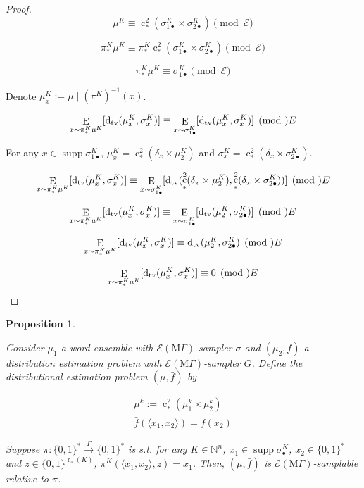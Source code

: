 \documentclass{article}
\numberwithin{equation}{section}
\theoremstyle{definition}
\theoremstyle{plain}
\newtheorem{proposition}{Proposition}[section]
\newcommand{\Bool}{\{0,1\}}
\newcommand{\Words}{{\Bool^*}}
\DeclareMathOperator{\Supp}{supp}
\DeclareMathOperator{\E}{E}
\DeclareMathOperator{\R}{r}
\DeclareMathOperator{\En}{c}
\newcommand{\Dtv}{\operatorname{d}_{\textnormal{tv}}}
\newcommand{\Nats}{\mathbb{N}}
\newcommand{\Chev}[1]{\langle #1 \rangle}
\newcommand{\MGrow}{\mathrm{M}\Gamma}
\newcommand{\Fall}{\mathcal{E}}
\newcommand{\EMG}{\Fall(\MGrow)}
\newcommand{\Scheme}{\xrightarrow{\Gamma}}
\begin{document}
\begin{proof}

\[\mu^{K} \equiv \En_*^2(\sigma_{1\bullet}^K \times \sigma_{2\bullet}^K)\pmod \Fall\]

\[\pi_*^K\mu^{K} \equiv \pi_*^K\En_*^2(\sigma_{1\bullet}^K \times \sigma_{2\bullet}^K) \pmod \Fall\] 

\[\pi_*^K\mu^{K} \equiv  \sigma_{1\bullet}^K \pmod \Fall\]

Denote $\mu_x^K:=\mu \mid (\pi^K)^{-1}(x)$.

\[\E_{x \sim \pi_*^K\mu^{K}}[\Dtv(\mu_x^K,\sigma_x^K)] \equiv \E_{x \sim \sigma_{1\bullet}^K}[\Dtv(\mu_x^K,\sigma_x^K)] \pmod \Fall\]

For any $x \in \Supp \sigma_{1\bullet}^{K}$, $\mu_x^K = \En_*^2(\delta_x \times \mu_2^{K})$ and $\sigma_x^K=\En_*^2(\delta_x \times \sigma_{2\bullet}^K)$.

\[\E_{x \sim \pi_*^K\mu^{K}}[\Dtv(\mu_x^K,\sigma_x^K)] \equiv \E_{x \sim \sigma_{1\bullet}^K}[\Dtv(\En_*^2(\delta_x \times \mu_2^{K}),\En_*^2(\delta_x \times \sigma_{2\bullet}^K))] \pmod \Fall\]

\[\E_{x \sim \pi_*^K\mu^{K}}[\Dtv(\mu_x^K,\sigma_x^K)] \equiv \E_{x \sim \sigma_{1\bullet}^K}[\Dtv(\mu_2^{K},\sigma_{2\bullet}^K)] \pmod \Fall\]

\[\E_{x \sim \pi_*^K\mu^{K}}[\Dtv(\mu_x^K,\sigma_x^K)] \equiv \Dtv(\mu_2^{K},\sigma_{2\bullet}^K) \pmod \Fall\]

\[\E_{x \sim \pi_*^K\mu^{K}}[\Dtv(\mu_x^K,\sigma_x^K)] \equiv 0 \pmod \Fall\]
\end{proof}

\begin{samepage}
\begin{proposition}
\label{prp:thm__mult__cond3}

Consider $\mu_1$ a word ensemble with $\EMG$-sampler $\sigma$ and $(\mu_2, f)$ a distribution estimation problem with $\EMG$-sampler $G$. Define the distributional estimation problem $(\mu,\bar{f})$ by 

\begin{align*}
\mu^k:=\En_*^2(\mu_1^k \times \mu_2^k)\\
\bar{f}(\Chev{x_1,x_2})=f(x_2)
\end{align*}

Suppose $\pi: \Words \Scheme \Words$ is s.t. for any $K \in \Nats^n$, ${x_1 \in \Supp \sigma_\bullet^{K}}$, ${x_2 \in \Words}$ and $z \in \Bool^{\R_\pi(K)}$, $\pi^{K}(\Chev{x_1,x_2},z)=x_1$. Then, $(\mu,\bar{f})$ is $\EMG$-samplable relative to $\pi$.

\end{proposition}
\end{samepage}
\end{document}
